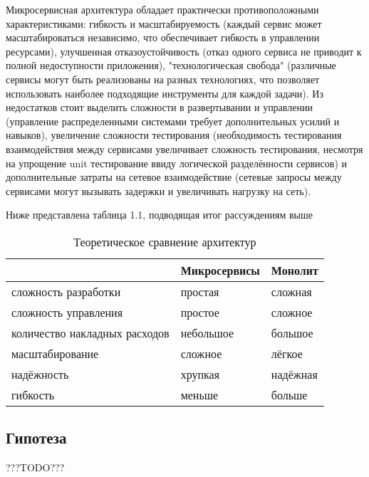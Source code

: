     Микросервисная архитектура обладает практически противоположными характеристиками: гибкость и масштабируемость (каждый сервис может масштабироваться независимо, что обеспечивает гибкость в управлении ресурсами), улучшенная отказоустойчивость (отказ одного сервиса не приводит к полной недоступности приложения), "технологическая свобода" (различные сервисы могут быть реализованы на разных технологиях, что позволяет использовать наиболее подходящие инструменты для каждой задачи). Из недостатков стоит выделить сложности в развертывании и управлении (управление распределенными системами требует дополнительных усилий и навыков), увеличение сложности тестирования (необходимость тестирования взаимодействия между сервисами увеличивает сложность тестирования, несмотря на упрощение unit тестирование ввиду логической разделённости сервисов) и дополнительные затраты на сетевое взаимодействие (сетевые запросы между сервисами могут вызывать задержки и увеличивать нагрузку на сеть).

    Ниже представлена таблица 1.1, подводящая итог рассуждениям выше

    \begin{table}
        \centering
        \begin{tabular}{ p{3cm} p{5cm} p{5cm} }
             & Микросервисы & Монолит \\ \hline
            сложность разработки & простая & сложная \\ \hline
            сложность управления & простое & сложное \\ \hline
            количество накладных расходов & небольшое & большое \\ \hline
            масштабирование & сложное & лёгкое \\ \hline
            надёжность & хрупкая & надёжная \\ \hline
            гибкость & меньше & больше \\
        \end{tabular}
        \caption{Теоретическое сравнение архитектур}
        \label{tab:my_label}
    \end{table}

\subsection{Гипотеза}
    ???TODO???
        
\clearpage